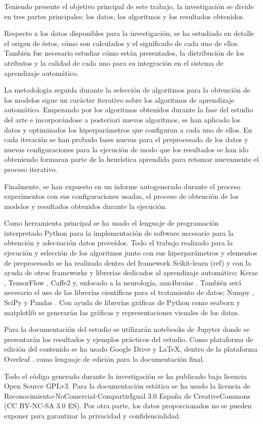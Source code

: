 Teniendo presente el objetivo principal de este trabajo, la investigación se divide en tres partes principales: los datos, los algoritmos y los resultados obtenidos.

Respecto a los datos disponibles para la investigación, se ha estudiado en detalle el origen de éstos, cómo son calculados y el significado de cada uno de ellos. También fue necesario estudiar cómo están presentados, la distribución de los atributos y la calidad de cada uno para su integración en el sistema de aprendizaje automático. 

La metodología seguida durante la selección de algoritmos para la obtención de los modelos sigue un carácter iterativo sobre los algoritmos de aprendizaje automático. Empezando por los algoritmos obtenidos durante la fase del estudio del arte e incorporándose a posteriori nuevos algoritmos, se han aplicado los datos y optimizados los hiperparámetros que configuran a cada uno de ellos. En cada iteración se han probado fases nuevas para el preprocesado de los datos y nuevas configuraciones para la ejecución de modo que los resultados se han ido obteniendo formaran parte de la heurística aprendida para retomar nuevamente el proceso iterativo.

Finalmente, se han expuesto en un informe autogenerado durante el proceso experimentos con sus configuraciones usadas, el proceso de obtención de los modelos y resultados obtenidos durante la ejecución. 

Como herramienta principal se ha usado el lenguaje de programación interpretado Python para la implementación de software necesario para la obtención y adecuación datos proveídos. Todo el trabajo realizado para la ejecución y selección de los algoritmos junto con sus hiperparámetros y elementos de preprocesado se ha realizado dentro del framework Scikit-learn (ref) y con la ayuda de otros frameworks y librerías dedicados al aprendizaje automático; Keras \cite{KerasDocumentation}, TensorFlow \cite{TensorFlow}, Caffe2 \cite{Caffe2Framework} y, enfocado a la neurología, ann4brains \cite{Kawahara2017BrainNetCNN:Neurodevelopment}. También será necesario el uso de las librerías científicas para el tratamiento de datos; Numpy \cite{NumPyNumPy}, SciPy \cite{SciPy.orgSciPy.org} y Pandas \cite{PythonLibrary}. Con ayuda de librerías gráficas de Python como seaborn \cite{Seaborn:Documentation} y matplotlib \cite{InstallationDocumentation} se generarán las gráficas y representaciones visuales de los datos.

Para la documentación del estudio se utilizarán notebooks de Jupyter \cite{ProjectHome} donde se presentarán los resultados y ejemplos prácticos del estudio. Como plataforma de edición del contenido se ha usado Google Drive y  \LaTeX \cite{LaTeXSystem}, dentro de la plataforma Overleaf \cite{Overleaf:Preview}. como lenguaje de edición para la documentación final. 

Todo el código generado durante la investigación se ha publicado bajo licencia Open Source GPLv3. Para la documentación estática se ha usado la licencia de Reconocimiento-NoComercial-CompartirIgual 3.0 España de CreativeCommons (CC BY-NC-SA 3.0 ES). Por otra parte, los datos proporcionados no se pueden exponer para garantizar la privacidad y confidencialidad. 
